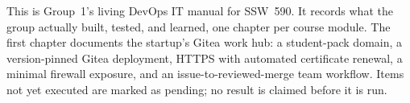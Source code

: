 This is Group~1's living DevOps IT manual for SSW~590. It records what the
group actually built, tested, and learned, one chapter per course module. The
first chapter documents the startup's Gitea work hub: a student-pack domain,
a version-pinned Gitea deployment, HTTPS with automated certificate renewal, a
minimal firewall exposure, and an issue-to-reviewed-merge team workflow. Items
not yet executed are marked as pending; no result is claimed before it is run.
